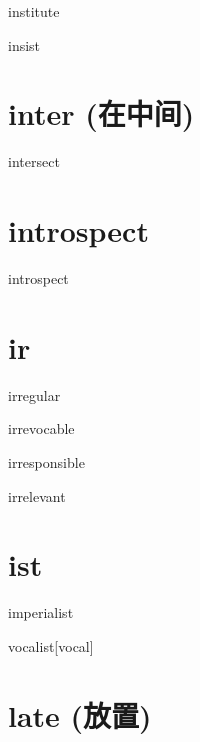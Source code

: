 \begin{RefWord}{institute}
\end{RefWord}

\begin{RefWord}{insist}
\end{RefWord}


\section{inter (在中间)}

\begin{RefWord}{intersect}
\end{RefWord}

\section{introspect}

\begin{RefWord}{introspect}
\end{RefWord}

\section{ir} 

\begin{RefWord}{irregular}
\end{RefWord}

\begin{RefWord}{irrevocable}
\end{RefWord}

\begin{RefWord}{irresponsible}
\end{RefWord}

\begin{RefWord}{irrelevant}
\end{RefWord}

\section{ist}

\begin{RefWord}{imperialist}
\end{RefWord}

\begin{RefWord}{vocalist}[vocal]
\end{RefWord}

\section{late (放置)}

